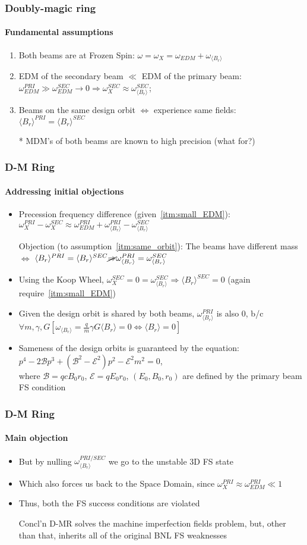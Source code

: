 \documentclass{beamer}
\newcommand{\w}{\omega}
\newcommand{\avg}[1]{\langle{#1}\rangle}
\begin{document}
\begin{frame}\frametitle{Doubly-magic ring}\framesubtitle{Fundamental assumptions}
  \begin{enumerate}
  \item Both beams are at Frozen Spin: $\w = \w_X = \w_{EDM} + \w_{\avg{B_r}}$
  \item EDM of the secondary beam $\ll$ EDM of the primary beam:
    $\w_{EDM}^{PRI} \gg \w_{EDM}^{SEC}\rightarrow 0 \Rightarrow \w_X^{SEC} \approx \w_{\avg{B_r}}^{SEC}$;
    \label{itm:small_EDM}
  \item Beams on the same design orbit $\Leftrightarrow$ experience same fields:
    $\avg{B_r}^{PRI} = \avg{B_r}^{SEC}$\label{itm:same_orbit}
  \item[*] MDM's of both beams are known to high precision (what for?)
  \end{enumerate}
\end{frame}
\begin{frame}\frametitle{D-M Ring}\framesubtitle{Addressing initial objections}
  \begin{itemize}
  \item Precession frequency difference (given~\ref{itm:small_EDM}):
    $\w_X^{PRI} - \w_X^{SEC} \approx \w_{EDM}^{PRI} + \w_{\avg{B_r}}^{PRI} - \w_{\avg{B_r}}^{SEC}$
  \item[Objection] (to assumption~\ref{itm:same_orbit}): The beams have different mass $\Leftrightarrow$
    $\avg{B_r}^{PRI} = \avg{B_r}^{SEC} \cancel{\Rightarrow}\w_{\avg{B_r}}^{PRI} = \w_{\avg{B_r}}^{SEC}$
  \item Using the Koop Wheel, $\w_X^{SEC} = 0 = \w_{\avg{B_r}}^{SEC} \Rightarrow \avg{B_r}^{SEC} = 0$
    (again require~\ref{itm:small_EDM})
  \item Given the design orbit is shared by both beams, $\w_{\avg{B_r}}^{PRI}$ is also 0, b/c
    $\forall m,\gamma,G\left[\w_{\avg{B_r}}=\frac qm\gamma G\avg{B_r} = 0\Leftrightarrow \avg{B_r}=0\right]$
  \item Sameness of the design orbits is guaranteed by the equation:
    $p^4 - 2\mathcal B p^3 + (\mathcal B^2-\mathcal E^2)p^2 - \mathcal E^2m^2 = 0$,\\ where
    $\mathcal B=qcB_0r_0$, $\mathcal E=qE_0r_0$, $(E_0, B_0, r_0)$ are defined by the primary beam FS condition
  \end{itemize}
\end{frame}
\begin{frame}\frametitle{D-M Ring}\framesubtitle{Main objection}
  \begin{itemize}
  \item But by nulling $\w_{\avg{B_r}}^{PRI/SEC}$ we go to the unstable 3D FS state
  \item Which also forces us back to the Space Domain, since $\w_X^{PRI} \approx \w_{EDM}^{PRI} \ll 1$
  \item Thus, both the FS success conditions are violated
  \item[Concl'n] D-MR solves the machine imperfection fields problem, but, other than that,
    inherits all of the original BNL FS weaknesses
  \end{itemize}
\end{frame}
\end{document}
